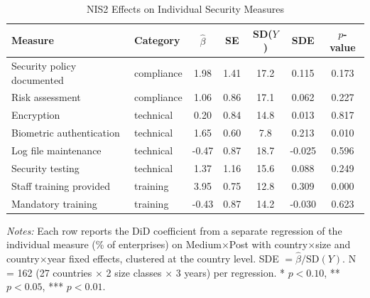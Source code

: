 \begin{table}[H]
\centering
\caption{NIS2 Effects on Individual Security Measures}
\label{tab:individual}
\begin{threeparttable}
\begin{tabular}{llccccc}
\toprule
Measure & Category & $\hat{\beta}$ & SE & SD($Y$) & SDE & $p$-value \\
\midrule
Security policy documented & compliance & 1.98 & 1.41 & 17.2 & 0.115 & 0.173 \\
Risk assessment & compliance & 1.06 & 0.86 & 17.1 & 0.062 & 0.227 \\
Encryption & technical & 0.20 & 0.84 & 14.8 & 0.013 & 0.817 \\
Biometric authentication & technical & 1.65 & 0.60 & 7.8 & 0.213 & 0.010 \\
Log file maintenance & technical & -0.47 & 0.87 & 18.7 & -0.025 & 0.596 \\
Security testing & technical & 1.37 & 1.16 & 15.6 & 0.088 & 0.249 \\
Staff training provided & training & 3.95 & 0.75 & 12.8 & 0.309 & 0.000 \\
Mandatory training & training & -0.43 & 0.87 & 14.2 & -0.030 & 0.623 \\
\bottomrule
\end{tabular}
\begin{tablenotes}[flushleft]
\small
\item \textit{Notes:} Each row reports the DiD coefficient from a separate regression of the individual measure (\% of enterprises) on Medium$\times$Post with country$\times$size and country$\times$year fixed effects, clustered at the country level. SDE $= \hat{\beta} / \text{SD}(Y)$. N = 162 (27 countries $\times$ 2 size classes $\times$ 3 years) per regression. * $p<0.10$, ** $p<0.05$, *** $p<0.01$.
\end{tablenotes}
\end{threeparttable}
\end{table}
